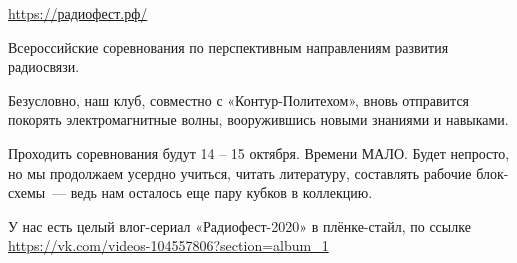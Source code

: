 
\noindent
{}
\hspace{1cm}\href{https://xn--80aidl4aimip.xn--p1ai/}{https://радиофест.рф/}

\noindent
Всероссийские соревнования по перспективным направлениям развития радиосвязи.

\medskip
Безусловно, наш клуб, совместно с «Контур-Политехом», вновь отправится покорять
электромагнитные волны, вооружившись новыми знаниями и навыками.

Проходить соревнования будут 14 -- 15 октября. Времени МАЛО. Будет непросто, но
мы продолжаем усердно учиться, читать литературу, составлять рабочие блок-схемы\
--- ведь нам осталось еще пару кубков в коллекцию.

У нас есть целый влог-сериал «Радиофест-2020» в плёнке-стайл, по ссылке 
\url{https://vk.com/videos-104557806?section=album_1}
